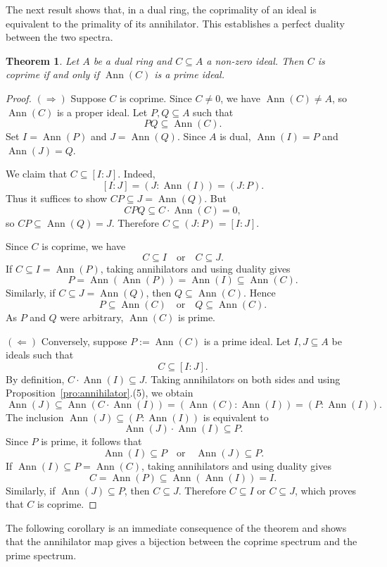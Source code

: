 \documentclass{amsart}
\newtheorem{theorem}{Theorem}
\DeclareMathOperator{\ann}{Ann}
\begin{document}
The next result shows that, in a dual ring, the coprimality of an ideal is equivalent to the primality of its annihilator. This establishes a perfect duality between the two spectra.

\begin{theorem}\label{thm:dual-coprime-prime}
Let $A$ be a dual ring and $C \subseteq A$ a non-zero ideal. Then $C$ is coprime if and only if $\ann(C)$ is a prime ideal.
\end{theorem}

\begin{proof}
$(\Rightarrow)$ Suppose $C$ is coprime. Since $C \neq 0$, we have $\ann(C) \neq A$, so $\ann(C)$ is a proper ideal. Let $P, Q \subseteq A$ such that
\[
PQ \subseteq \ann(C).
\]
Set $I = \ann(P)$ and $J = \ann(Q)$. Since $A$ is dual, $\ann(I) = P$ and $\ann(J) = Q$.

We claim that $C \subseteq [I:J]$. Indeed,
\[
[I:J] = (J:\ann(I)) = (J:P).
\]
Thus it suffices to show $CP \subseteq J = \ann(Q)$. But
\[
C P Q \subseteq C \cdot \ann(C) = 0,
\]
so $CP \subseteq \ann(Q) = J$. Therefore $C \subseteq (J:P) = [I:J]$.

Since $C$ is coprime, we have
\[
C \subseteq I \quad \text{or} \quad C \subseteq J.
\]
If $C \subseteq I = \ann(P)$, taking annihilators and using duality gives
\[
P = \ann(\ann(P)) = \ann(I) \subseteq \ann(C).
\]
Similarly, if $C \subseteq J = \ann(Q)$, then $Q \subseteq \ann(C)$. Hence
\[
P \subseteq \ann(C) \quad \text{or} \quad Q \subseteq \ann(C).
\]
As $P$ and $Q$ were arbitrary, $\ann(C)$ is prime.

$(\Leftarrow)$ Conversely, suppose $P := \ann(C)$ is a prime ideal. Let $I, J \subseteq A$ be ideals such that
\[
C \subseteq [I:J].
\]
By definition, $C \cdot \ann(I) \subseteq J$. Taking annihilators on both sides and using Proposition~\ref{pro:annihilator}.(5), we obtain
\[
\ann(J) \subseteq \ann(C \cdot \ann(I)) = (\ann(C):\ann(I)) = (P:\ann(I)).
\]
The inclusion $\ann(J) \subseteq (P:\ann(I))$ is equivalent to
\[
\ann(J) \cdot \ann(I) \subseteq P.
\]
Since $P$ is prime, it follows that
\[
\ann(I) \subseteq P \quad \text{or} \quad \ann(J) \subseteq P.
\]
If $\ann(I) \subseteq P = \ann(C)$, taking annihilators and using duality gives
\[
C = \ann(P) \subseteq \ann(\ann(I)) = I.
\]
Similarly, if $\ann(J) \subseteq P$, then $C \subseteq J$. Therefore $C \subseteq I$ or $C \subseteq J$, which proves that $C$ is coprime.
\end{proof}

The following corollary is an immediate consequence of the theorem and shows that the annihilator map gives a bijection between the coprime spectrum and the prime spectrum.
\end{document}

